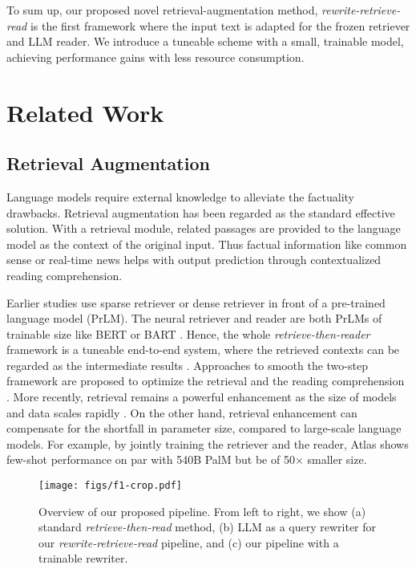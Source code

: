 To sum up, our proposed novel retrieval-augmentation method, \textit{rewrite-retrieve-read} is the first framework where the input text is adapted for the frozen retriever and LLM reader. 
We introduce a tuneable scheme with a small, trainable model, achieving performance gains with less resource consumption. 

\section{Related Work}
\subsection{Retrieval Augmentation}
Language models require external knowledge to alleviate the factuality drawbacks.
Retrieval augmentation has been regarded as the standard effective solution. 
With a retrieval module, related passages are provided to the language model as the context of the original input. 
Thus factual information like common sense or real-time news helps with output prediction through contextualized reading comprehension. 

Earlier studies use sparse retriever \cite{chen2017reading} or dense retriever \cite{karpukhin-etal-2020-dense} in front of a pre-trained language model (PrLM).
The neural retriever and reader are both PrLMs of trainable size like BERT \cite{bert2019Devlin} or BART \cite{bart2020Lewis}.
Hence, the whole \textit{retrieve-then-reader} framework is a tuneable end-to-end system, where the retrieved contexts can be regarded as the intermediate results \cite{karpukhin-etal-2020-dense, lewis2020rag}.
Approaches to smooth the two-step framework are proposed to optimize the retrieval and the reading comprehension \cite{emdr22021SachanRHDY21, lee-etal-2022-need, jiang-etal-2022-reatt}.
More recently, retrieval remains a powerful enhancement as the size of models and data scales rapidly \cite{mallen2023llm_memorization, shi2023replug, brown2020language}.
On the other hand, retrieval enhancement can compensate for the shortfall in parameter size, compared to large-scale language models.
For example,
by jointly training the retriever and the reader, Atlas \cite{atlas_few-shot_2022} shows few-shot performance on par with 540B PalM \cite{chowdhery2022palm} but be of 50$\times$ smaller size.

\begin{figure*}[t]
		\centering
		\texttt{[image: figs/f1-crop.pdf]}
		\caption{\label{overview} Overview of our proposed pipeline. From left to right, we show (a) standard \textit{retrieve-then-read} method, (b) LLM as a query rewriter for our \textit{rewrite-retrieve-read} pipeline, and (c) our pipeline with a trainable rewriter. }
\end{figure*}

